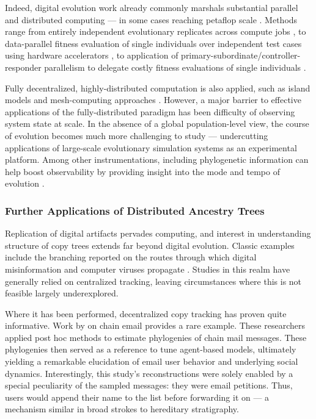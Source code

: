 Indeed, digital evolution work already commonly marshals substantial parallel and distributed computing  --- in some cases reaching petaflop scale \citep{gilbert2015artificial}.
Methods range from entirely independent evolutionary replicates across compute jobs \citep{dolson2017spatial, hornby2006automated}, to data-parallel fitness evaluation of single individuals over independent test cases using hardware accelerators \citep{harding2007fast_springer, langdon2019continuous}, to application of primary-subordinate/controller-responder parallelism to delegate costly fitness evaluations of single individuals \citep{cantu2001master,miikkulainen2019evolving}.

Fully decentralized, highly-distributed computation is also applied, such as island models \citep{bennett1999building,schulte2010genetic} and mesh-computing approaches \citep{ackley2018digital,moreno2021conduit}.
However, a major barrier to effective applications of the fully-distributed paradigm has been difficulty of observing system state at scale.
In the absence of a global population-level view, the course of evolution becomes much more challenging to study --- undercutting applications of large-scale evolutionary simulation systems as an experimental platform.
Among other instrumentations, including phylogenetic information can help boost observability by providing insight into the mode and tempo of evolution \citep{dolson2020interpreting}.

\subsubsection{Further Applications of Distributed Ancestry Trees}

Replication of digital artifacts pervades computing, and interest in understanding structure of copy trees extends far beyond digital evolution.
Classic examples include the branching reported on the routes through which digital misinformation and computer viruses propagate \citep{friggeri2014rumor,cohen1987computer}.
Studies in this realm have generally relied on centralized tracking, leaving
circumstances where this is not feasible largely underexplored.

Where it has been performed, decentralized copy tracking has proven quite informative.
Work by \cite{libennowell2008tracing} on chain email provides a rare example.
These researchers applied post hoc methods to estimate phylogenies of chain mail messages.
These phylogenies then served as a reference to tune agent-based models, ultimately yielding a remarkable elucidation of email user behavior and underlying social dynamics.
Interestingly, this study's reconstructions were solely enabled by a special peculiarity of the sampled messages: they were email petitions.
Thus, users would append their name to the list before forwarding it on --- a mechanism similar in broad strokes to hereditary stratigraphy.

